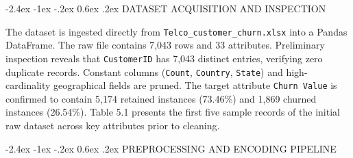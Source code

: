 \documentclass[12pt,oneside]{report}
\makeatletter
\renewcommand{\section}{\@startsection{section}{1}{\z@}%
  {-2.4ex \@plus -1ex \@minus -.2ex}%
  {0.6ex \@plus .2ex}%
  {\normalfont\large\bfseries}}
\makeatother
\begin{document}
\section{DATASET ACQUISITION AND INSPECTION}

The dataset is ingested directly from \texttt{Telco\_customer\_churn.xlsx} into a Pandas DataFrame. The raw file contains 7,043 rows and 33 attributes. Preliminary inspection reveals that \texttt{CustomerID} has 7,043 distinct entries, verifying zero duplicate records. Constant columns (\texttt{Count}, \texttt{Country}, \texttt{State}) and high-cardinality geographical fields are pruned. The target attribute \texttt{Churn Value} is confirmed to contain 5,174 retained instances (73.46\%) and 1,869 churned instances (26.54\%). Table 5.1 presents the first five sample records of the initial raw dataset across key attributes prior to cleaning.

\begin{table}[H]
\centering
\scriptsize
\caption{Initial Telco Customer Churn Dataset (First 5 Rows before Preprocessing).}
\label{tab:5.1}
\vspace{0.05in}
\end{table}

\section{PREPROCESSING AND ENCODING PIPELINE}
\end{document}
